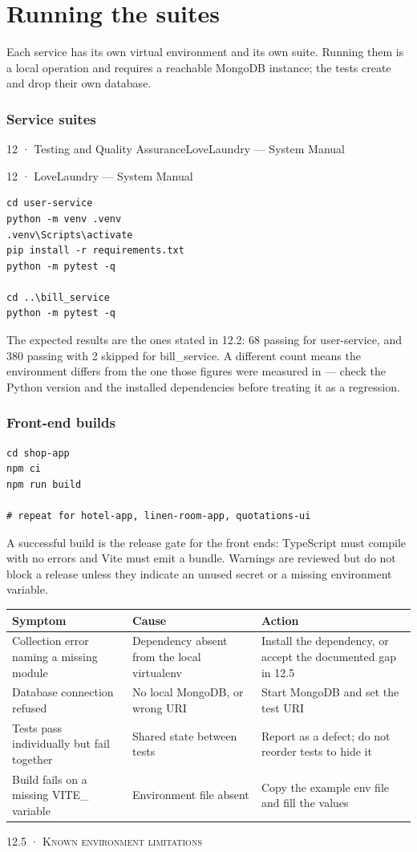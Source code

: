 \documentclass[11pt,a4paper,oneside]{book}
\begin{document}
\section*{Running the suites}
Each service has its own virtual environment and its own suite. Running them is a local operation and requires a reachable MongoDB instance; the tests create and drop their own database.

\subsubsection*{Service suites}
12 · Testing and Quality AssuranceLoveLaundry — System Manual

12 · LoveLaundry — System Manual

\begin{verbatim}
cd user-service
python -m venv .venv
.venv\Scripts\activate
pip install -r requirements.txt
python -m pytest -q

cd ..\bill_service
python -m pytest -q
\end{verbatim}
The expected results are the ones stated in 12.2: 68 passing for user-service, and 380 passing with 2 skipped for bill\_service. A different count means the environment differs from the one those figures were measured in — check the Python version and the installed dependencies before treating it as a regression.

\subsubsection*{Front-end builds}
\begin{verbatim}
cd shop-app
npm ci
npm run build

# repeat for hotel-app, linen-room-app, quotations-ui
\end{verbatim}
A successful build is the release gate for the front ends: TypeScript must compile with no errors and Vite must emit a bundle. Warnings are reviewed but do not block a release unless they indicate an unused secret or a missing environment variable.

\begin{center}\small
\begin{tabularx}{\linewidth}{|X|X|X|}
\hline
\rowcolor{lightgrey}
\textbf{Symptom} & \textbf{Cause} & \textbf{Action} \\ \hline
Collection error naming a missing module & Dependency absent from the local virtualenv & Install the dependency, or accept the documented gap in 12.5 \\ \hline
Database connection refused & No local MongoDB, or wrong URI & Start MongoDB and set the test URI \\ \hline
Tests pass individually but fail together & Shared state between tests & Report as a defect; do not reorder tests to hide it \\ \hline
Build fails on a missing VITE\_ variable & Environment file absent & Copy the example env file and fill the values \\ \hline
\end{tabularx}
\end{center}
\textsc{\small\color{crimson}12.5 · Known environment limitations}\par\medskip
\end{document}
